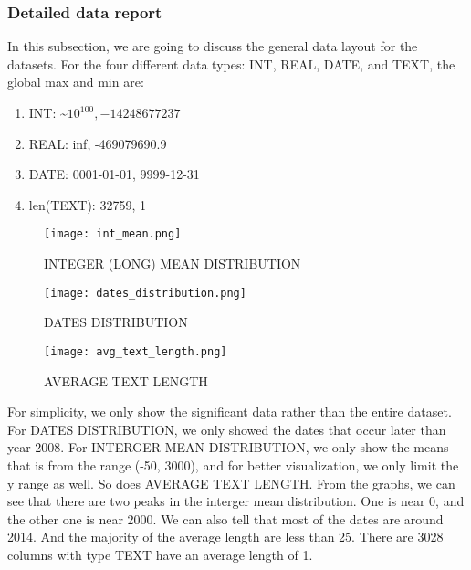 \documentclass[sigconf]{acmart}
\begin{document}
\subsubsection{Detailed data report} In this subsection, we are going to discuss the general data layout for the datasets. For the four different data types: INT, REAL, DATE, and TEXT, the global max and min are:
\begin{enumerate}
    \item INT: \textasciitilde$10^{100}, -14248677237$
    \item REAL: inf, -469079690.9
    \item DATE: 0001-01-01, 9999-12-31
    \item len(TEXT): 32759, 1
\end{enumerate}
\begin{figure}[htp]
    \centering
    \texttt{[image: int\_mean.png]}
    \caption{INTEGER (LONG) MEAN DISTRIBUTION}
    \label{fig:galaxy}
\end{figure}
\begin{figure}[htp]
    \centering
    \texttt{[image: dates\_distribution.png]}
    \caption{DATES DISTRIBUTION}
    \label{fig:galaxy}
\end{figure}
\begin{figure}[htp]
    \centering
    \texttt{[image: avg\_text\_length.png]}
    \caption{AVERAGE TEXT LENGTH}
    \label{fig:galaxy}
\end{figure}
For simplicity, we only show the significant data rather than the entire dataset. For DATES DISTRIBUTION, we only showed the dates that occur later than year 2008. For INTERGER MEAN DISTRIBUTION, we only show the means that is from the range (-50, 3000), and for better visualization, we only limit the y range as well. So does AVERAGE TEXT LENGTH.
From the graphs, we can see that there are two peaks in the interger mean distribution. One is near 0, and the other one is near 2000. We can also tell that most of the dates are around 2014. And the majority of the average length are less than 25. There are 3028 columns with type TEXT have an average length of 1.
\end{document}
